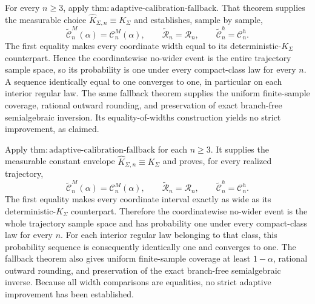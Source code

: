 For every \(n\geq3\), apply
\(\mathrm{thm{:}adaptive\mbox{-}calibration\mbox{-}fallback}\).  That
theorem supplies the measurable choice
\(\widehat K_{\Sigma,n}\equiv K_\Sigma\) and establishes, sample by
sample,
\[
 \widetilde{\mathcal C}_n^M(\alpha)=\mathcal C_n^M(\alpha),
 \qquad
 \widetilde{\mathcal R}_n=\mathcal R_n,
 \qquad
 \widetilde{\mathcal C}_n^h=\mathcal C_n^h.
\]
The first equality makes every coordinate width equal to its
deterministic-\(K_\Sigma\) counterpart.  Hence the coordinatewise no-wider
event is the entire trajectory sample space, so its probability is one
under every compact-class law for every \(n\).  A sequence identically
equal to one converges to one, in particular on each interior regular law.
The same fallback theorem supplies the uniform finite-sample coverage,
rational outward rounding, and preservation of exact branch-free
semialgebraic inversion.  Its equality-of-widths construction yields no
strict improvement, as claimed.

Apply \(\mathrm{thm{:}adaptive\mbox{-}calibration\mbox{-}fallback}\) for
each \(n\geq3\).  It supplies the measurable constant envelope
\(\widehat K_{\Sigma,n}\equiv K_\Sigma\) and proves, for every realized
trajectory,
\[
 \widetilde{\mathcal C}_n^M(\alpha)=\mathcal C_n^M(\alpha),
 \qquad
 \widetilde{\mathcal R}_n=\mathcal R_n,
 \qquad
 \widetilde{\mathcal C}_n^h=\mathcal C_n^h.
\]
The first equality makes every coordinate interval exactly as wide as its
deterministic-\(K_\Sigma\) counterpart.  Therefore the coordinatewise
no-wider event is the whole trajectory sample space and has probability one
under every compact-class law for every \(n\).  For each interior regular
law belonging to that class, this probability sequence is consequently
identically one and converges to one.  The fallback theorem also gives
uniform finite-sample coverage at least \(1-\alpha\), rational outward
rounding, and preservation of the exact branch-free semialgebraic inverse.
Because all width comparisons are equalities, no strict adaptive
improvement has been established.
